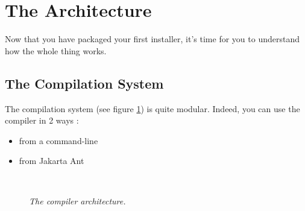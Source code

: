 \section{The \IzPack Architecture}

Now that you have packaged your first installer, it's time for you to understand
how the whole thing works.\\

\subsection{The Compilation System}

The compilation system (see figure \ref{comparch}) is quite modular. 
Indeed, you can use the compiler in 2 ways :
\begin{itemize}
  \item from a command-line
  \item from Jakarta Ant
\end{itemize}\

\begin{figure}[h]
\caption{\label{comparch}
         \textit{The compiler architecture.}}
\begin{center}
\end{center}
\end{figure}

